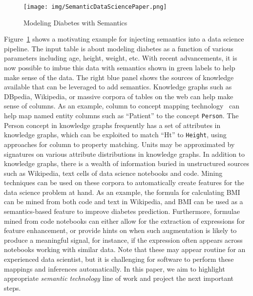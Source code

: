\documentclass[sigconf, nonacm]{acmart}
\begin{document}
\begin{figure}
    \centering
    \texttt{[image: img/SemanticDataSciencePaper.png]}
    \caption{Modeling Diabetes with Semantics}
    \label{fig:example}
\end{figure}

Figure~\ref{fig:example} shows a motivating example for injecting semantics into a data science pipeline.  The input table is about modeling diabetes as a function of various parameters including age, height, weight, etc.  With recent advancements, it is now possible to imbue this data with semantics shown in green labels to help make sense of the data. The right blue panel shows the sources of knowledge available that can be leveraged to add semantics. Knowledge graphs such as DBpedia, Wikipedia, or massive corpora of tables on the web can help make sense of columns. As an example, column to concept mapping technology~\cite{10.1145/3292500.3330993,khurana2020semantic} can help map named entity columns such as ``Patient'' to the concept \texttt{Person}. The Person concept in knowledge graphs frequently has a set of attributes in knowledge graphs, which can be exploited to match ``Ht'' to \texttt{Height}, using approaches for column to property matching.  Units may be approximated by signatures on various attribute distributions in knowledge graphs.  In addition to knowledge graphs, there is a wealth of information buried in unstructured sources such as Wikipedia, text cells of data science notebooks and code. Mining techniques can be used on these corpora to automatically create features for the data science problem at hand.  As an example, the formula for calculating BMI can be mined from both code and text in Wikipedia, and BMI can be used as a semantics-based feature to improve diabetes prediction.  Furthermore, formulae mined from code notebooks can either allow for the extraction of expressions for feature enhancement, or provide hints on when such augmentation is likely to produce a meaningful signal, for instance, if the expression often appears across notebooks working with similar data. Note that these may appear routine for an experienced data scientist, but it is challenging for software to perform these mappings and inferences automatically.  In this paper, we aim to highlight appropriate {\em semantic technology} line of work and project the next important steps.
\end{document}
